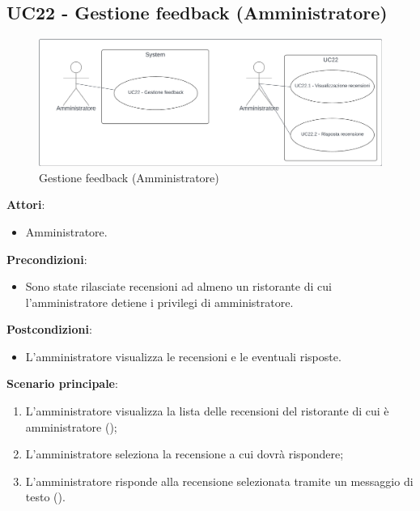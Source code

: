 \subsection{UC22 - Gestione feedback (Amministratore)}\label{usecase2:22}
\begin{figure}[H]
    \centering
    \includegraphics[width=0.9\linewidth]{ucd/ucd22.png}
    \caption{Gestione feedback (Amministratore)}
\end{figure}
\textbf{Attori}:
\begin{itemize}
    \item Amministratore.
\end{itemize}
\textbf{Precondizioni}:
\begin{itemize}
    \item Sono state rilasciate recensioni ad almeno un ristorante di cui l'amministratore detiene i privilegi di amministratore.
\end{itemize}
\textbf{Postcondizioni}:
\begin{itemize}
    \item L'amministratore visualizza le recensioni e le eventuali risposte.
\end{itemize}
\textbf{Scenario principale}:
\begin{enumerate}
    \item L'amministratore visualizza la lista delle recensioni del ristorante di cui è amministratore ();
    \item L'amministratore seleziona la recensione a cui dovrà rispondere;
    \item L'amministratore risponde alla recensione selezionata tramite un messaggio di testo ().
\end{enumerate}
